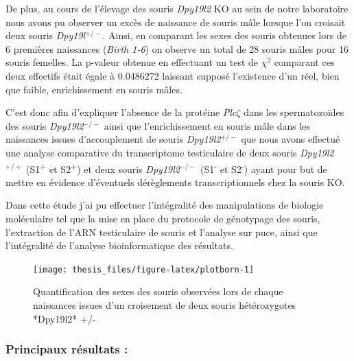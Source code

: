\documentclass[12pt,twoside]{ugathesis}
\theoremstyle{definition}
\theoremstyle{definition}
\theoremstyle{remark}
\begin{document}
De plus, au cours de l'élevage des souris \emph{Dpy19l2} KO au sein de
notre laboratoire nous avons pu observer un excès de naissance de souris
mâle lorsque l'on croisait deux souris \emph{Dpy19l}\(^{+/-}\). Ainsi,
en comparant les sexes des souris obtenues lors de 6 premières
naissances (\emph{Birth 1-6}) on observe un total de 28 souris mâles
pour 16 souris femelles. La p-valeur obtenue en effectuant un test de
\(\chi^2\) comparant ces deux effectifs était égale à 0.0486272 laissant
supposé l'existence d'un réel, bien que faible, enrichissement en souris
mâles.

C'est donc afin d'expliquer l'absence de la protéine \emph{Plc}\(\zeta\)
dans les spermatozoïdes des souris \emph{Dpy19l2}\(^{-/-}\) ainsi que
l'enrichissement en souris mâle dans les naissances issues
d'accouplement de souris \emph{Dpy19l2}\(^{+/-}\) que nous avons
effectué une analyse comparative du transcriptome testiculaire de deux
souris \emph{Dpy19l2}\(^{+/+}\) (S1\textsuperscript{+} et
S2\textsuperscript{+}) et deux souris \emph{Dpy19l2}\(^{-/-}\)
(S1\textsuperscript{-} et S2\textsuperscript{-}) ayant pour but de
mettre en évidence d'éventuels dérèglements transcriptionnels chez la
souris KO.

Dans cette étude j'ai pu effectuer l'intégralité des manipulations de
biologie moléculaire tel que la mise en place du protocole de génotypage
des souris, l'extraction de l'ARN testiculaire de souris et l'analyse
sur puce, ainsi que l'intégralité de l'analyse bioinformatique des
résultats.

\newpage

\begin{figure}

{\centering \texttt{[image: thesis\_files/figure-latex/plotborn-1]} 

}

\caption[Quantification des sexes des souris observées lors de chaque naissances issues d'un croisement de deux souris hétérozygotes *Dpy19l2* +/-]{Quantification des sexes des souris observées lors de chaque naissances issues d'un croisement de deux souris hétérozygotes *Dpy19l2* +/-}\label{fig:plotborn}
\end{figure}

\newpage



\newpage

\subsubsection{Principaux résultats :}\label{principaux-resultats-1}
\end{document}
